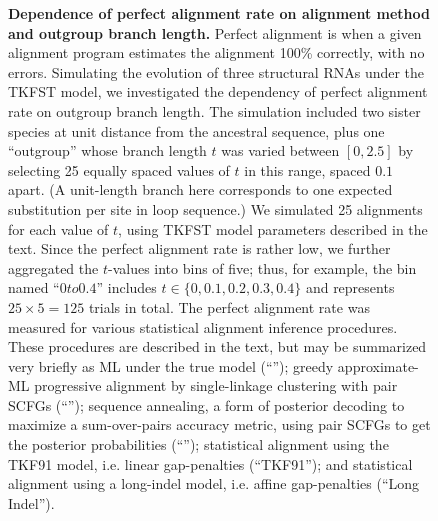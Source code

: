 \documentclass[10pt]{article}
\begin{document}
\begin{figure}[!ht]
  \centering
  \caption{
    \textbf{Dependence of perfect alignment rate on alignment method and outgroup branch
      length.}
    Perfect alignment is when a given alignment program estimates the alignment 100\% correctly, with no errors.
    Simulating the evolution of three structural RNAs under the TKFST model,
    we investigated the dependency of perfect alignment rate on outgroup branch length.
    The simulation included two sister species at unit distance from the ancestral sequence, plus one ``outgroup''
    whose branch length $t$ was varied between $[0, 2.5]$ by selecting 25 equally spaced values of $t$ in this range, spaced $0.1$ apart.
    (A unit-length branch here corresponds to one expected substitution per site in loop sequence.)
    We simulated 25 alignments for each value of $t$, using TKFST model parameters described in the text.
    Since the perfect alignment rate is rather low, we further aggregated the $t$-values into bins of five;
    thus, for example, the bin named ``$0 to 0.4$'' includes $t \in \{ 0, 0.1, 0.2, 0.3, 0.4 \}$ and represents $25 \times 5 = 125$ trials in total.
    The perfect alignment rate was measured for various statistical alignment inference procedures.
    These procedures are described in the text, but may be summarized very briefly as
    ML under the true model (``\indiegram'');
    greedy approximate-ML progressive alignment by single-linkage clustering with pair SCFGs (``\stemloc'');
    sequence annealing, a form of posterior decoding to maximize a sum-over-pairs accuracy metric, using pair SCFGs to get the posterior probabilities (``\stemlocama'');
    statistical alignment using the TKF91 model, i.e. linear gap-penalties (``TKF91''); and
    statistical alignment using a long-indel model, i.e. affine gap-penalties (``Long Indel'').
}
\end{figure}
\end{document}
